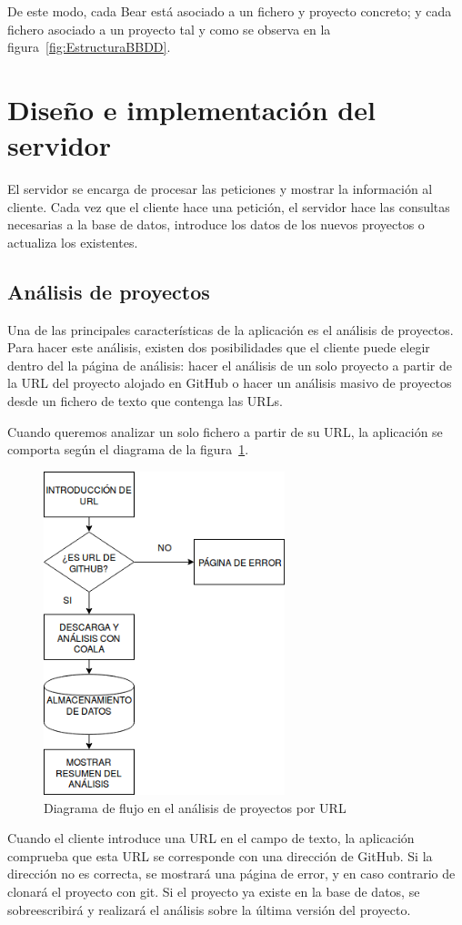\documentclass[a4paper, 12pt]{book}
\begin{document}
De este modo, cada Bear está asociado a un fichero y proyecto concreto; y cada fichero asociado a un proyecto tal y como se observa en la figura~\ref{fig:EstructuraBBDD}.

\section{Diseño e implementación del servidor} 
\label{sec:seccion12}
El servidor se encarga de procesar las peticiones y mostrar la información al cliente. Cada vez que el cliente hace una petición, el servidor hace las consultas necesarias a la base de datos, introduce los datos de los nuevos proyectos o actualiza los existentes.

\subsection{Análisis de proyectos}
\label{sec:seccion12.1}
Una de las principales características de la aplicación es el análisis de proyectos. Para hacer este análisis, existen dos posibilidades que el cliente puede elegir dentro del la página de análisis: hacer el análisis de un solo proyecto a partir de la URL del proyecto alojado en GitHub o hacer un análisis masivo de proyectos desde un fichero de texto que contenga las URLs.

Cuando queremos analizar un solo fichero a partir de su URL, la aplicación se comporta según el diagrama de la figura~\ref{fig:AnalizarURL}.
\begin{figure}[h]
  \centering
  \includegraphics[width=7cm, keepaspectratio]{img/AnalizarURL}
  \caption{Diagrama de flujo en el análisis de proyectos por URL}
  \label{fig:AnalizarURL}
\end{figure}
Cuando el cliente introduce una URL en el campo de texto, la aplicación comprueba que esta URL se corresponde con una dirección de GitHub. Si la dirección no es correcta, se mostrará una página de error, y en caso contrario de clonará el proyecto con git. Si el proyecto ya existe en la base de datos, se sobreescribirá y realizará el análisis sobre la última versión del proyecto.
\end{document}
